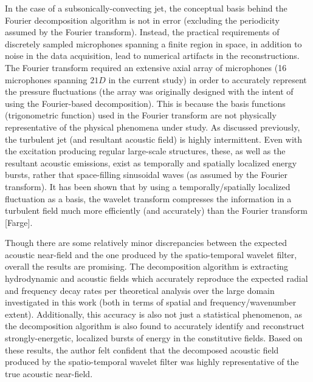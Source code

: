 In the case of a subsonically-convecting jet, the conceptual basis behind the Fourier decomposition algorithm is not in error (excluding the periodicity assumed by the Fourier transform). 
Instead, the practical requirements of discretely sampled microphones spanning a finite region in space, in addition to noise in the data acquisition, lead to numerical artifacts in the reconstructions. 
The Fourier transform required an extensive axial array of microphones (16 microphones spanning $21D$ in the current study) in order to accurately represent the pressure fluctuations (the array was originally designed with the intent of using the  Fourier-based decomposition).  
This is because the basis functions (trigonometric function) used in the Fourier transform are not physically representative of the physical phenomena under study. 
As discussed previously, the turbulent jet (and resultant acoustic field) is highly intermittent. 
Even with the excitation producing regular large-scale structures, these, as well as the resultant acoustic emissions, exist as temporally and spatially localized energy bursts, rather that space-filling sinusoidal waves (as assumed by the Fourier transform). 
It has been shown that by using a temporally/spatially localized fluctuation as a basis, the wavelet transform compresses the information in a turbulent field much more efficiently (and accurately) than the Fourier transform [Farge].

Though there are some relatively minor discrepancies between the expected acoustic near-field and the one produced by the spatio-temporal wavelet filter, overall the results are promising.
The decomposition algorithm is extracting hydrodynamic and acoustic fields which accurately reproduce the expected radial and frequency decay rates per theoretical analysis over the large domain investigated in this work (both in terms of spatial and frequency/wavenumber extent).
Additionally, this accuracy is also not just a statistical phenomenon, as the decomposition algorithm is also found to accurately identify and reconstruct strongly-energetic, localized bursts of energy in the constitutive fields. 
Based on these results, the author felt confident that the decomposed acoustic field produced by the spatio-temporal wavelet filter was highly representative of the true acoustic near-field.

